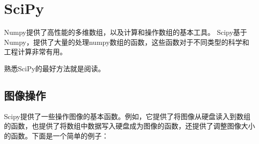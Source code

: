 \section{SciPy}
\begin{frame}

Numpy提供了高性能的多维数组，以及计算和操作数组的基本工具。 Scipy基于 Numpy，提供了大量的处理numpy数组的函数，这些函数对于不同类型的科学和工程计算非常有用。

熟悉SciPy的最好方法就是阅读\href{http://docs.scipy.org/doc/scipy/reference/index.html}{}。

\end{frame}
\subsection{图像操作}
\begin{frame}

Scipy提供了一些操作图像的基本函数。例如，它提供了将图像从硬盘读入到数组的函数，也提供了将数组中数据写入硬盘成为图像的函数，还提供了调整图像大小的函数。下面是一个简单的例子：


\end{frame}

